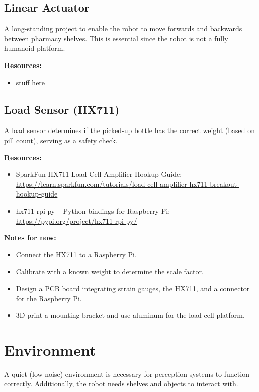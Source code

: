 \documentclass[11pt]{article}
\begin{document}
\subsection{Linear Actuator}
A long-standing project to enable the robot to move forwards and backwards between pharmacy shelves. This is essential since the robot is not a fully humanoid platform.

\textbf{Resources:}
\begin{itemize}[nosep]
    \item stuff here
\end{itemize}

\subsection{Load Sensor (HX711)}
A load sensor determines if the picked-up bottle has the correct weight (based on pill count), serving as a safety check.

\textbf{Resources:}
\begin{itemize}[nosep]
    \item SparkFun HX711 Load Cell Amplifier Hookup Guide: \url{https://learn.sparkfun.com/tutorials/load-cell-amplifier-hx711-breakout-hookup-guide}
    \item hx711-rpi-py -- Python bindings for Raspberry Pi: \url{https://pypi.org/project/hx711-rpi-py/}
\end{itemize}

\textbf{Notes for now:}
\begin{itemize}[nosep]
    \item Connect the HX711 to a Raspberry Pi.
    \item Calibrate with a known weight to determine the scale factor.
    \item Design a PCB board integrating strain gauges, the HX711, and a connector for the Raspberry Pi.
    \item 3D-print a mounting bracket and use aluminum for the load cell platform.
\end{itemize}

\section{Environment}
\label{sec:environment}

A quiet (low-noise) environment is necessary for perception systems to function correctly. Additionally, the robot needs shelves and objects to interact with.
\end{document}
